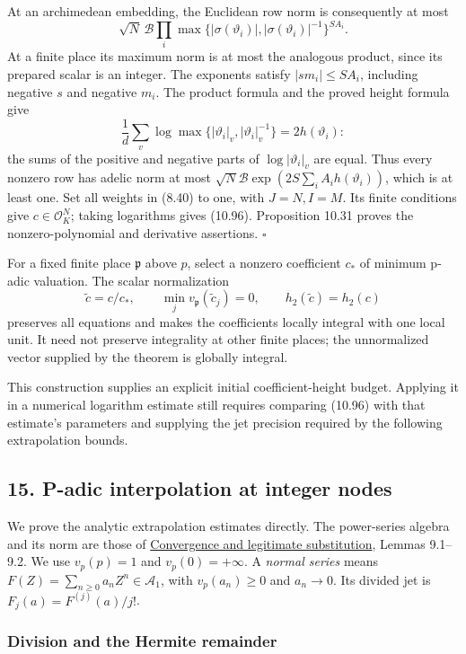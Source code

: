 \documentclass[
  11pt,
  a4paper,
]{article}
\begin{document}
At an archimedean embedding, the Euclidean row norm is consequently at
most \[
\sqrt N\,\mathcal B\prod_i
\max\{|\sigma(\vartheta_i)|,|\sigma(\vartheta_i)|^{-1}\}^{SA_i}.
\] At a finite place its maximum norm is at most the analogous product,
since its prepared scalar is an integer. The exponents satisfy
\(|s m_i|\le SA_i\), including negative \(s\) and negative \(m_i\). The
product formula and the proved height formula give \[
\frac1d\sum_v\log\max\{|\vartheta_i|_v,|\vartheta_i|_v^{-1}\}
=2h(\vartheta_i):
\] the sums of the positive and negative parts of
\(\log|\vartheta_i|_v\) are equal. Thus every nonzero row has adelic
norm at most \(\sqrt N\mathcal B\exp(2S\sum_i A_i h(\vartheta_i))\),
which is at least one. Set all weights in (8.40) to one, with
\(J=N,I=M\). Its finite conditions give \(c\in\mathcal O_K^N\); taking
logarithms gives (10.96). Proposition 10.31 proves the
nonzero-polynomial and derivative assertions. \(\square\)

For a fixed finite place \(\mathfrak p\) above \(p\), select a nonzero
coefficient \(c_*\) of minimum p-adic valuation. The scalar
normalization \[
\widetilde c=c/c_*,\qquad
\min_j v_{\mathfrak p}(\widetilde c_j)=0,\qquad
h_2(\widetilde c)=h_2(c)
\tag{10.97}
\] preserves all equations and makes the coefficients locally integral
with one local unit. It need not preserve integrality at other finite
places; the unnormalized vector supplied by the theorem is globally
integral.

This construction supplies an explicit initial coefficient-height
budget. Applying it in a numerical logarithm estimate still requires
comparing (10.96) with that estimate's parameters and supplying the jet
precision required by the following extrapolation bounds.

\subsection{15. P-adic interpolation at integer
nodes}\label{p-adic-interpolation-at-integer-nodes}

We prove the analytic extrapolation estimates directly. The power-series
algebra and its norm are those of
\href{../TR-BAKER-09.html\#2-convergence-and-legitimate-substitution}{Convergence
and legitimate substitution}, Lemmas 9.1--9.2. We use \(v_p(p)=1\) and
\(v_p(0)=+\infty\). A \emph{normal series} means
\(F(Z)=\sum_{n\ge0}a_n Z^n\in\mathcal A_1\), with \(v_p(a_n)\ge0\) and
\(a_n\to0\). Its divided jet is \(F_j(a)=F^{(j)}(a)/j!\).

\subsubsection{Division and the Hermite
remainder}\label{division-and-the-hermite-remainder}
\end{document}
